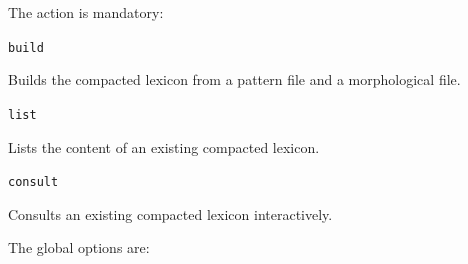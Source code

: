 \documentclass[11pt]{article}
\begin{document}
The action is mandatory:

\begin{description}
	\item \verb#build#

	      Builds the compacted lexicon from a pattern file and a morphological
	      file.

	\item \verb#list#

	      Lists the content of an existing compacted lexicon.

	\item \verb#consult#

	      Consults an existing compacted lexicon interactively.
\end{description}

The global options are:
\end{document}
